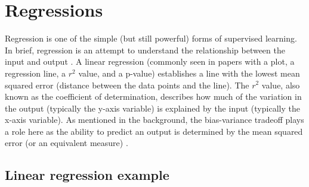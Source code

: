 \documentclass[12pt,openany]{book}
\begin{document}
\section{Regressions}\label{regressions}

Regression is one of the simple (but still powerful) forms of supervised
learning. In brief, regression is an attempt to understand the
relationship between the input and output \citep{shalizi}. A linear
regression (commonly seen in papers with a plot, a regression line, a
\(r^2\) value, and a p-value) establishes a line with the lowest mean
squared error (distance between the data points and the line). The
\(r^2\) value, also known as the coefficient of determination, describes
how much of the variation in the output (typically the y-axis variable)
is explained by the input (typically the x-axis variable). As mentioned
in the background, the bias-variance tradeoff plays a role here as the
ability to predict an output is determined by the mean squared error (or
an equivalent measure) \citep{shalizi}.

\subsection{Linear regression example}\label{linear-regression-example}
\end{document}
